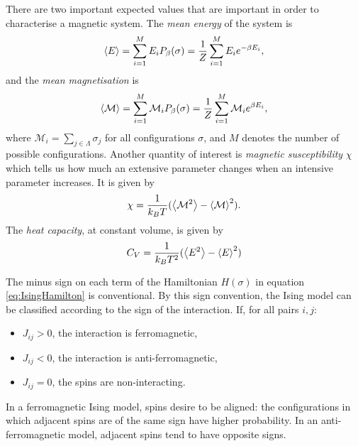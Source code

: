 \documentclass[10pt,a4paper]{amsart}
\begin{document}
There are two important expected values that are important in order to characterise a magnetic system. The \emph{mean energy} of the system is
\begin{equation}
\label{eq:meanenergy}
\ev{E} = \sum_{i=1}^ME_iP_\beta(\sigma) = \frac{1}{Z}\sum_{i=1}^ME_ie^{-\beta E_i},
\end{equation}
and the \emph{mean magnetisation} is
\begin{equation}
\label{eq:meanmagnet}
\ev{\mathcal{M}} = \sum_{i=1}^M\mathcal{M}_iP_\beta(\sigma) = \frac{1}{Z}\sum_{i=1}^M\mathcal{M}_ie^{\beta E_i},
\end{equation}
where $\mathcal{M}_i = \sum_{j \in \Lambda}\sigma_j$ for all configurations $\sigma$, and $M$ denotes the number of possible configurations. Another quantity of interest is \emph{magnetic susceptibility} $\chi$ which tells us how much an extensive parameter changes when an intensive parameter increases. It is given by
\begin{equation}
\label{eq:susceptibility}
\chi = \frac{1}{k_BT}(\ev{\mathcal{M}^2} - \ev{\mathcal{M}}^2).
\end{equation}
The \emph{heat capacity}, at constant volume, is given by
\begin{equation}
\label{eq:heatcap}
C_V = \frac{1}{k_BT^2}(\ev{E^2}-\ev{E}^2)
\end{equation}

The minus sign on each term of the Hamiltonian $H(\sigma)$ in equation \ref{eq:IsingHamilton} is conventional. By this sign convention, the Ising model can be classified according to the sign of the interaction. If, for all pairs $i,j$:
\begin{itemize}
\item $J_{ij} > 0$, the interaction is ferromagnetic,
\item $J_{ij} < 0$, the interaction is anti-ferromagnetic,
\item $J_{ij} = 0$, the spins are non-interacting.
\end{itemize}
In a ferromagnetic Ising model, spins desire to be aligned: the configurations in which adjacent spins are of the same sign have higher probability. In an anti-ferromagnetic model, adjacent spins tend to have opposite signs.
\end{document}
